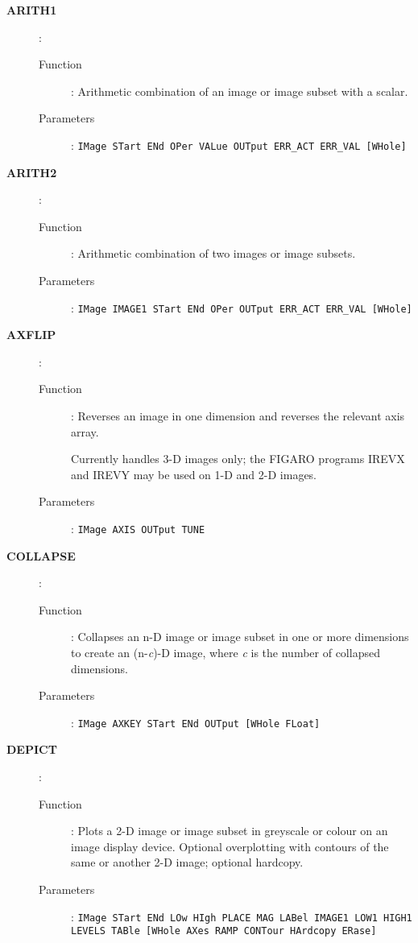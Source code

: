 \begin{description}

\item[\large\bf ARITH1]:
   \begin{description}
   \item[Function]:
      Arithmetic combination of an image or image subset with a scalar.
   \item[Parameters]:
      {\tt IMage STart ENd OPer VALue OUTput ERR\_ACT ERR\_VAL [WHole]}
   \end{description}

\item[\large\bf ARITH2]:
   \begin{description}
   \item[Function]:
      Arithmetic combination of two images or image subsets.
   \item[Parameters]:
      {\tt IMage IMAGE1 STart ENd OPer OUTput ERR\_ACT ERR\_VAL [WHole]}
   \end{description}

\item[\large\bf AXFLIP]:
   \begin{description}
   \item[Function]:
      Reverses an image in one dimension and reverses the relevant axis array.

      Currently handles 3-D images only; the FIGARO programs IREVX and IREVY
      may be used on 1-D and 2-D images.
   \item[Parameters]:
      {\tt IMage AXIS OUTput TUNE}
   \end{description}

\item[\large\bf COLLAPSE]:
   \begin{description}
   \item[Function]:
      Collapses an n-D image or image subset in one or more dimensions to
      create an (n-{\it c})-D image, where {\it c} is the number of collapsed
      dimensions.
   \item[Parameters]:
      {\tt IMage AXKEY STart ENd OUTput [WHole FLoat]}
   \end{description}

\item[\large\bf DEPICT]:
   \begin{description}
   \item[Function]:
      Plots a 2-D image or image subset in greyscale or colour on an image
      display device. Optional overplotting with contours of the same or
      another 2-D image; optional hardcopy.
   \item[Parameters]:
      {\tt IMage STart ENd LOw HIgh PLACE MAG LABel IMAGE1 LOW1 HIGH1\\
      LEVELS TABle [WHole AXes RAMP CONTour HArdcopy ERase]}
   \end{description}


\end{description}
